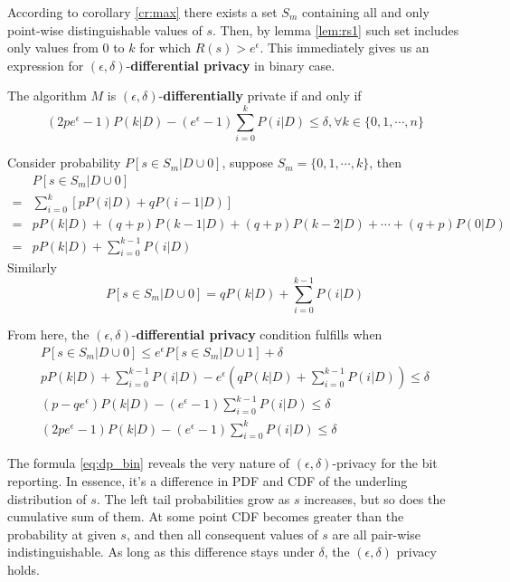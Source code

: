 \documentclass[11pt]{article}
\begin{document}
According to corollary \ref{cr:max} there exists a set $S_m$ containing all and only point-wise distinguishable values of $s$.  Then, by lemma \ref{lem:rs1} such set includes only values from 0 to $k$ for which $R(s) > e^\epsilon$.   This immediately gives us an expression for $(\epsilon,\delta)$-\textbf{differential privacy}  in binary case.
\begin{lem} \label{lem:dp_bin}
The algorithm $M$ is $(\epsilon,\delta)$-\textbf{differentially} private if and only if   
\begin{equation} \label{eq:dp_bin}
(2pe^\epsilon - 1)P(k | D ) - (e^\epsilon - 1) \sum^{k} _{i=0}P(i|D) \le \delta, \forall k \in \{0,1,\cdots, n\}
\end{equation}
\begin{pf}
Consider probability $P[s \in S_m|D \cup 0]$, suppose $S_m = \{0,1, \cdots, k\}$, then
\begin{align*}
 & P[s \in S_m|D \cup 0]   \\
 = & \sum^k_{i=0} \left [ p P(i | D ) + q P( i - 1 | D) \right ]  \\
 = & p P(k | D )  + (q+p)P(k-1|D) + (q+p)P(k-2|D) + \cdots + (q+p)P(0|D)  \\
 = & p  P(k | D )  + \sum_{i=0}^{k-1} P(i|D) 
\end{align*}
Similarly
\[ P[s \in S_m|D \cup 0] = q  P(k | D )  + \sum^{k-1} _{i=0}P(i|D) \]

From here, the $(\epsilon,\delta)$-\textbf{differential privacy} condition fulfills when
\begin{align}
P[s \in S_m|D \cup 0] \le e^{\epsilon}P[s \in S_m|D \cup 1] + \delta   \\
p  P(k | D )  + \sum_{i=0}^{k-1} P(i|D) - e^\epsilon \left ( q  P(k | D )  + \sum^{k-1} _{i=0}P(i|D) \right ) \le \delta \\
(p - qe^\epsilon)P(k | D ) - (e^\epsilon - 1) \sum^{k-1} _{i=0}P(i|D) \le \delta \\
(2pe^\epsilon - 1)P(k | D ) - (e^\epsilon - 1) \sum^{k} _{i=0}P(i|D) \le \delta
\end{align}
\end{pf}
\end{lem}

The formula \ref{eq:dp_bin} reveals the very nature of  $(\epsilon,\delta)$-privacy for the bit reporting. In essence, it's a difference in PDF and CDF of the underling distribution of $s$.  The left tail probabilities grow as $s$ increases, but so does the cumulative sum of them.  At some point CDF becomes greater than the probability at given $s$, and then all consequent values of $s$ are all pair-wise indistinguishable.  As long as this difference stays under $\delta$, the $(\epsilon,\delta)$ privacy holds.
\end{document}

